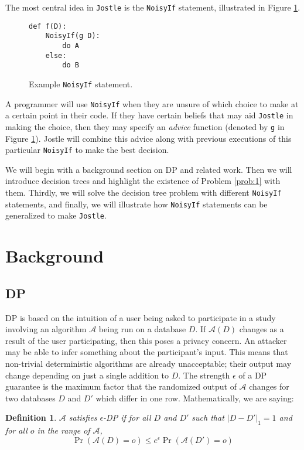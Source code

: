 \documentclass[11pt]{article}
\newtheorem{defn}{Definition}
\newcommand{\Jostle}{\texttt{Jostle}}
\begin{document}
The most central idea in \Jostle{} is the \texttt{NoisyIf} statement, illustrated in Figure \ref{fig:1}.
\begin{figure}
\begin{verbatim}
def f(D):
    NoisyIf(g D):
        do A
    else:
        do B
\end{verbatim}
\caption{Example \texttt{NoisyIf} statement.}
\label{fig:1}
\end{figure}
A programmer will use \texttt{NoisyIf} when they are unsure of which choice to make at a certain point in their code. If they have certain beliefs that may aid \Jostle{} in making the choice, then they may specify an \emph{advice} function (denoted by \texttt{g} in Figure \ref{fig:1}). Jostle will combine this advice along with previous executions of this particular \texttt{NoisyIf} to make the best decision.

We will begin with a background section on DP and related work. Then we will introduce decision trees and highlight the existence of Problem \ref{prob:1} with them. Thirdly, we will solve the decision tree problem with different \texttt{NoisyIf} statements, and finally, we will illustrate how \texttt{NoisyIf} statements can be generalized to make \texttt{Jostle}.

\section{Background}
\subsection{DP}
DP is based on the intuition of a user being asked to participate in a study involving an algorithm $\mathcal{A}$ being run on a database $D$. If $\mathcal{A}(D)$ changes as a result of the user participating, then this poses a privacy concern. An attacker may be able to infer something about the participant's input. This means that non-trivial deterministic algorithms are already unacceptable; their output may change depending on just a single addition to $D$. The strength $\epsilon$ of a DP guarantee is the maximum factor that the randomized output of $\mathcal{A}$ changes for two databases $D$ and $D'$ which differ in one row. Mathematically, we are saying:

\begin{defn}
$\mathcal{A}$ satisfies $\epsilon$-DP if for all $D$ and $D'$ such that $|D-D'|_1=1$ and for all $o$ in the range of $\mathcal{A}$, 
\[\Pr\left(\mathcal{A}(D) = o \right) \leq e^{\epsilon} \Pr\left(\mathcal{A}(D')=o\right)\]
\end{defn}
\end{document}
